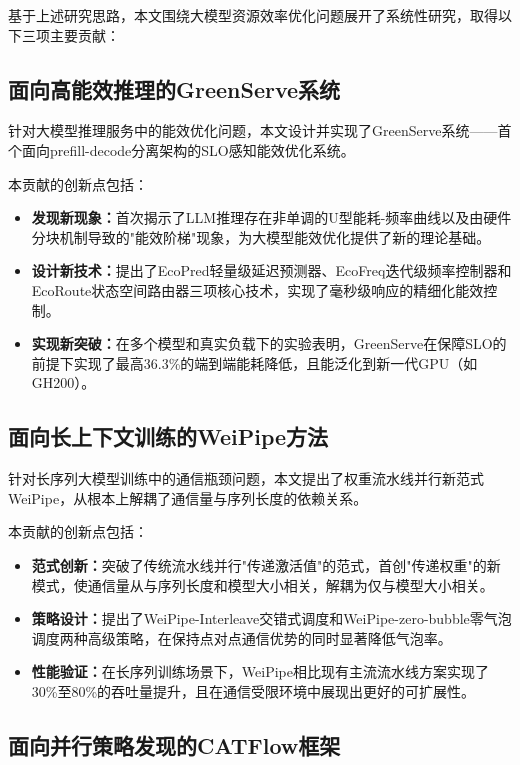基于上述研究思路，本文围绕大模型资源效率优化问题展开了系统性研究，取得以下三项主要贡献：

\subsection{面向高能效推理的GreenServe系统}

针对大模型推理服务中的能效优化问题，本文设计并实现了GreenServe系统——首个面向prefill-decode分离架构的SLO感知能效优化系统。

本贡献的创新点包括：
\begin{itemize}
    \item \textbf{发现新现象：}首次揭示了LLM推理存在非单调的U型能耗-频率曲线以及由硬件分块机制导致的"能效阶梯"现象，为大模型能效优化提供了新的理论基础。
    \item \textbf{设计新技术：}提出了EcoPred轻量级延迟预测器、EcoFreq迭代级频率控制器和EcoRoute状态空间路由器三项核心技术，实现了毫秒级响应的精细化能效控制。
    \item \textbf{实现新突破：}在多个模型和真实负载下的实验表明，GreenServe在保障SLO的前提下实现了最高36.3\%的端到端能耗降低，且能泛化到新一代GPU（如GH200）。
\end{itemize}

\subsection{面向长上下文训练的WeiPipe方法}

针对长序列大模型训练中的通信瓶颈问题，本文提出了权重流水线并行新范式WeiPipe，从根本上解耦了通信量与序列长度的依赖关系。

本贡献的创新点包括：
\begin{itemize}
    \item \textbf{范式创新：}突破了传统流水线并行"传递激活值"的范式，首创"传递权重"的新模式，使通信量从与序列长度和模型大小相关，解耦为仅与模型大小相关。
    \item \textbf{策略设计：}提出了WeiPipe-Interleave交错式调度和WeiPipe-zero-bubble零气泡调度两种高级策略，在保持点对点通信优势的同时显著降低气泡率。
    \item \textbf{性能验证：}在长序列训练场景下，WeiPipe相比现有主流流水线方案实现了30\%至80\%的吞吐量提升，且在通信受限环境中展现出更好的可扩展性。
\end{itemize}

\subsection{面向并行策略发现的CATFlow框架}

